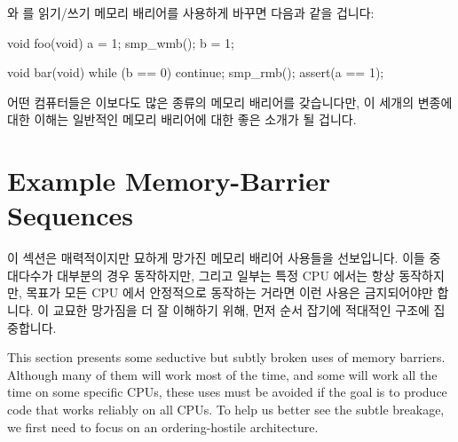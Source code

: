  와  를 읽기/쓰기 메모리 배리어를 사용하게 바꾸면 다음과
같을 겁니다:

\iffalse

The effect of this is that a read memory barrier orders only loads
on the CPU that executes it, so that all loads preceding the read memory
barrier will appear to have completed before any load following the
read memory barrier.
Similarly, a write memory barrier orders
only stores, again on the CPU that executes it, and again so that
all stores preceding the write memory barrier will appear to have
completed before any store following the write memory barrier.
A full-fledged memory barrier orders both loads and stores, but again
only on the CPU executing the memory barrier.

If we update \co{foo()} and \co{bar()} to use read and write memory
barriers, they appear as follows:

\fi

\begin{VerbatimN}[fontsize=\footnotesize,samepage=true]
void foo(void)
{
	a = 1;
	smp_wmb();
	b = 1;
}

void bar(void)
{
	while (b == 0) continue;
	smp_rmb();
	assert(a == 1);
}
\end{VerbatimN}

어떤 컴퓨터들은 이보다도 많은 종류의 메모리 배리어를 갖습니다만, 이 세개의
변종에 대한 이해는 일반적인 메모리 배리어에 대한 좋은 소개가 될 겁니다.

\iffalse

Some computers have even more flavors of memory barriers, but
understanding these three variants will provide a good introduction
to memory barriers in general.

\fi

\section{Example Memory-Barrier Sequences}
\label{sec:app:whymb:Example Memory-Barrier Sequences}

이 섹션은 매력적이지만 묘하게 망가진 메모리 배리어 사용들을 선보입니다.
이들 중 대다수가 대부분의 경우 동작하지만, 그리고 일부는 특정 CPU 에서는 항상
동작하지만, 목표가 모든 CPU 에서 안정적으로 동작하는 거라면 이런 사용은
금지되어야만 합니다.
이 교묘한 망가짐을 더 잘 이해하기 위해, 먼저 순서 잡기에 적대적인 구조에
집중합니다.

\iffalse

This section presents some seductive but subtly broken uses of
memory barriers.
Although many of them will work most of the time, and some will
work all the time on some specific CPUs, these uses must be avoided
if the goal is to produce code that works reliably on all CPUs.
To help us better see the subtle breakage, we first need to focus
on an ordering-hostile architecture.

